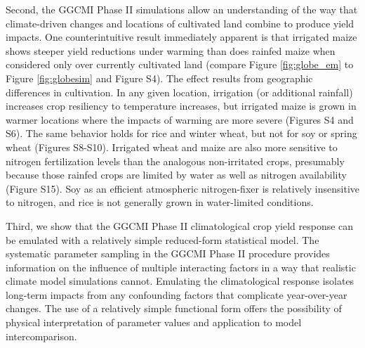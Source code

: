 \documentclass[esd, manuscript]{copernicus} %
\begin{document}
Second, the GGCMI Phase II simulations allow an understanding of the way that climate-driven changes and locations of cultivated land combine to produce yield impacts. One counterintuitive result immediately apparent is that irrigated maize shows steeper yield reductions under warming than does rainfed maize when considered only over currently cultivated land (compare Figure \ref{fig:globe_em} to Figure \ref{fig:globesim} and Figure S4). The effect results from geographic differences in cultivation. In any given location, irrigation (or additional rainfall) increases crop resiliency to temperature increases, but irrigated maize is grown in warmer locations where the impacts of warming are more severe (Figures S4 and S6). The same behavior holds for rice and winter wheat, but not for soy or spring wheat (Figures S8-S10). Irrigated wheat and maize are also more sensitive to nitrogen fertilization levels than the analogous non-irritated crops, presumably because those rainfed crops are limited by water as well as nitrogen availability (Figure S15). Soy as an efficient atmospheric nitrogen-fixer is relatively insensitive to nitrogen, and rice is not generally grown in water-limited conditions.

Third, we show that the GGCMI Phase II climatological crop yield response can be emulated with a relatively simple reduced-form statistical model. The systematic parameter sampling in the GGCMI Phase II procedure provides information on the influence of multiple interacting factors in a way that realistic climate model simulations cannot. Emulating the climatological response isolates long-term impacts from any confounding factors that complicate year-over-year changes. The use of a relatively simple functional form offers the possibility of physical interpretation of parameter values and application to model intercomparison.

\end{document}
